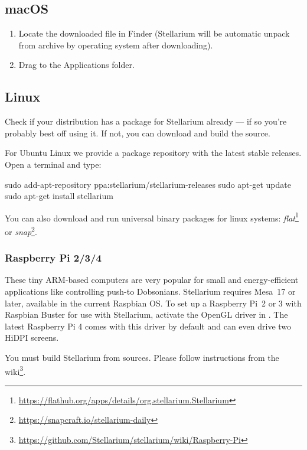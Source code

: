 \subsection{macOS}
\label{sec:GettingStarted:Installation:OSX}

\begin{enumerate}
\item Locate the downloaded  file in
  Finder (Stellarium will be automatic unpack from archive by operating system after downloading).
\item
  Drag  to the Applications folder.
\end{enumerate}

\subsection{Linux}
\label{sec:GettingStarted:Installation:Linux}

Check if your distribution has a package for Stellarium already --- if
so you're probably best off using it. If not, you can download and build
the source.

For Ubuntu Linux we provide a package repository with the latest stable
releases. Open a terminal and type:

\begin{commands}
sudo add-apt-repository ppa:stellarium/stellarium-releases
sudo apt-get update
sudo apt-get install stellarium
\end{commands}

You can also download and run universal binary packages for linux systems:  \emph{flat}\footnote{\url{https://flathub.org/apps/details/org.stellarium.Stellarium}} or \emph{snap}\footnote{\url{https://snapcraft.io/stellarium-daily}}.

\subsubsection{Raspberry Pi 2/3/4}
These tiny ARM-based computers are very popular for small and energy-efficient applications like controlling push-to Dobsonians. 
Stellarium requires Mesa~17 or later, available in the current Raspbian OS. 
To set up a Raspberry Pi~2 or 3 with Raspbian Buster for use with Stellarium, activate the OpenGL driver in 
. The latest Raspberry Pi 4 comes with this driver by default and can even drive two HiDPI screens.

You must build Stellarium from sources. Please follow instructions from the wiki\footnote{\url{https://github.com/Stellarium/stellarium/wiki/Raspberry-Pi}}.

